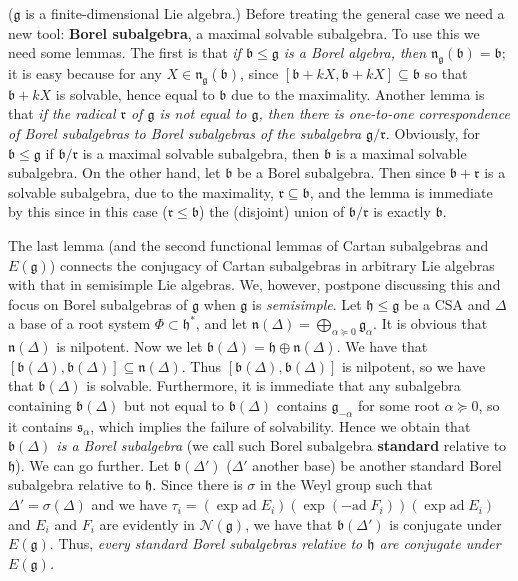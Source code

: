 \documentclass{article}
\newcommand{\lie}[1]{\mathfrak{#1}}
\newcommand{\ad}[1]{\mathrm{ad}\; #1}
\begin{document}
($\lie{g}$ is a finite-dimensional Lie algebra.)
Before treating the general case we need a new tool: \textbf{Borel subalgebra}, a maximal solvable subalgebra.
To use this we need some lemmas.
The first is that \textit{if $\lie{b} \le \lie{g}$ is a Borel algebra, then $\lie{n}_\lie{g}(\lie{b}) = \lie{b}$}; it is easy because for any $X \in \lie{n}_\lie{g}(\lie{b})$, since $[\lie{b} + kX, \lie{b} + kX] \subseteq \lie{b}$ so that $\lie{b} + kX$ is solvable, hence equal to $\lie{b}$ due to the maximality.
Another lemma is that \textit{if the radical $\lie{r}$ of $\lie{g}$ is not equal to $\lie{g}$, then there is one-to-one correspondence of Borel subalgebras to Borel subalgebras of the subalgebra $\lie{g}/\lie{r}$.}
Obviously, for $\lie{b} \le \lie{g}$ if $\lie{b}/\lie{r}$ is a maximal solvable subalgebra, then $\lie{b}$ is a maximal solvable subalgebra.
On the other hand, let $\lie{b}$ be a Borel subalgebra.
Then since $\lie{b} + \lie{r}$ is a solvable subalgebra, due to the maximality, $\lie{r} \subseteq \lie{b}$, and the lemma is immediate by this since in this case ($\lie{r} \le \lie{b}$) the (disjoint) union of $\lie{b}/\lie{r}$ is exactly $\lie{b}$.

The last lemma (and the second functional lemmas of Cartan subalgebras and $E(\lie{g})$) connects the conjugacy of Cartan subalgebras in arbitrary Lie algebras with that in semisimple Lie algebras.
We, however, postpone discussing this and focus on Borel subalgebras of $\lie{g}$ when $\lie{g}$ is \textit{semisimple}.
Let $\lie{h} \le \lie{g}$ be a CSA and $\Delta$ a base of a root system $\Phi \subset \lie{h}^*$, and let $\lie{n}(\Delta) = \bigoplus_{\alpha \succeq 0} \lie{g}_\alpha$.
It is obvious that $\lie{n}(\Delta)$ is nilpotent.
Now we let $\lie{b}(\Delta) = \lie{h} \oplus \lie{n}(\Delta)$.
We have that $[\lie{b}(\Delta), \lie{b}(\Delta)] \subseteq \lie{n}(\Delta)$.
Thus $[\lie{b}(\Delta), \lie{b}(\Delta)]$ is nilpotent, so we have that $\lie{b}(\Delta)$ is solvable.
Furthermore, it is immediate that any subalgebra containing $\lie{b}(\Delta)$ but not equal to $\lie{b}(\Delta)$ contains $\lie{g}_{-\alpha}$ for some root $\alpha \succeq 0$, so it contains $\lie{s}_\alpha$, which implies the failure of solvability.
Hence we obtain that \textit{$\lie{b}(\Delta)$ is a Borel subalgebra} (we call such Borel subalgebra \textbf{standard} relative to $\lie{h}$).
We can go further.
Let $\lie{b}(\Delta')$ ($\Delta'$ another base) be another standard Borel subalgebra relative to $\lie{h}$.
Since there is $\sigma$ in the Weyl group such that $\Delta' = \sigma(\Delta)$ and we have $\tau_i = (\exp{\ad{E_i}}) (\exp{(-\ad{F_i})}) (\exp{\ad{E_i}})$ and $E_i$ and $F_i$ are evidently in $\mathcal{N}(\lie{g})$, we have that $\lie{b}(\Delta')$ is conjugate under $E(\lie{g})$.
Thus, \textit{every standard Borel subalgebras relative to $\lie{h}$ are conjugate under $E(\lie{g})$.}
\end{document}
